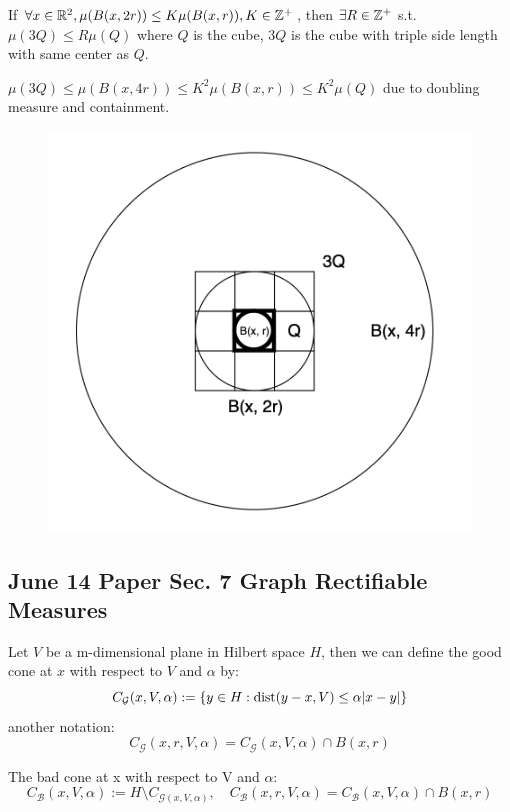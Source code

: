 \begin{proposition}
    If $\forall x\in \mathbb{R}^2, \mu(B(x, 2r))\leq K\mu(B(x,r)), K\in\mathbb{Z}^+$, then $\exists R\in \mathbb{Z}^+$ s.t. $\mu(3Q)\leq R\mu(Q)$ where $Q$ is the cube, 3$Q$ is the cube with triple side length with same center as $Q$. 
\end{proposition}
\proof  $\mu(3Q) \leq \mu(B(x, 4r)) \leq K^2\mu(B(x, r))\leq K^2 \mu(Q)$ due to doubling measure and containment. 

\begin{figure}[H]
    \centering
    \includegraphics[width=.66\textwidth]{images/doubleMcube.png}
\end{figure}


\newpage
\subsection{June 14 Paper \texorpdfstring{\cite{naples2020}}{Lg} Sec. 7 Graph Rectifiable Measures}

\begin{definition}
    Let $V$ be a m-dimensional plane in Hilbert space $H$, then we can define the good cone at $x$ with respect to $V$ and $\alpha$ by:
    $$
    C_\mathcal{G}(x, V, \alpha) := \{y\in H: \operatorname{dist}(y-x, V) \leq \alpha |x-y|\}
    $$
    another notation:
    $$
    C_\mathcal{G}(x, r, V, \alpha) = C_\mathcal{G}(x, V, \alpha) \cap B(x, r)
    $$
\end{definition}
\begin{definition}
    The bad cone at x with respect to V and $\alpha$:
    $$
    C_\mathcal{B}(x, V, \alpha) := H\setminus C_{\mathcal{G}(x, V, \alpha)}, \quad C_\mathcal{B}(x, r, V, \alpha) = C_\mathcal{B}(x, V, \alpha) \cap B(x, r)
    $$
\end{definition}


